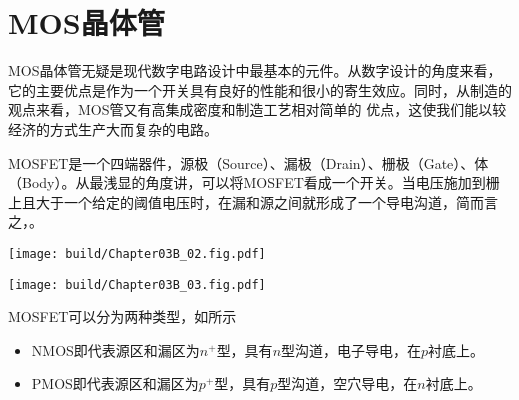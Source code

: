 \section{MOS晶体管}
MOS晶体管无疑是现代数字电路设计中最基本的元件。从数字设计的角度来看，它的主要优点是作为一个开关具有良好的性能和很小的寄生效应。同时，从制造的观点来看，MOS管又有高集成密度和制造工艺相对简单的 优点，这使我们能以较经济的方式生产大而复杂的电路。

MOSFET是一个四端器件，源极（Source）、漏极（Drain）、栅极（Gate）、体（Body）。从最浅显的角度讲，可以将MOSFET看成一个开关。当电压施加到栅上且大于一个给定的阈值电压时，在漏和源之间就形成了一个导电沟道，简而言之，。

\begin{Figure}[集成电路工艺中MOSFET的截面图]
    \begin{FigureSub}[NMOS]
        \texttt{[image: build/Chapter03B\_02.fig.pdf]}
    \end{FigureSub}
    \hspace{1cm}
    \begin{FigureSub}[PMOS]
        \texttt{[image: build/Chapter03B\_03.fig.pdf]}
    \end{FigureSub}
\end{Figure}

MOSFET可以分为两种类型，如所示
\begin{itemize}
    \item NMOS即代表源区和漏区为$n^{+}$型，具有$n$型沟道，电子导电，在$p$\hspace{0.43em}衬底上。
    \item PMOS\hspace{0.4em}即代表源区和漏区为$p^{+}$\hspace{0.43em}型，具有$p$\hspace{0.43em}型沟道，空穴导电，在$n$衬底上。
\end{itemize}

